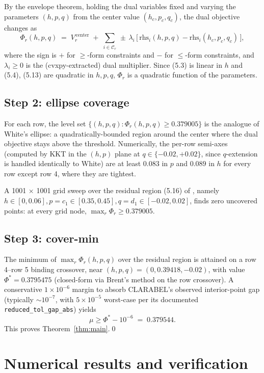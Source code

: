 \documentclass[11pt]{article}
\theoremstyle{plain}
\theoremstyle{definition}
\begin{document}
By the envelope theorem, holding the dual variables fixed and varying
the parameters $(h, p, q)$ from the center value
$(h_c, p_c, q_c)$, the dual objective changes as
\[
\Phi_r(h, p, q) \;=\; V_r^{\,\text{center}}
\;+\; \sum_{i \in \mathcal{C}_r}\, \pm\, \lambda_i\, \bigl[\,\text{rhs}_i(h, p, q) - \text{rhs}_i(h_c, p_c, q_c)\,\bigr],
\]
where the sign is $+$ for $\ge$-form constraints and $-$ for $\le$-form
constraints, and $\lambda_i \ge 0$ is the (cvxpy-extracted) dual
multiplier. Since (5.3) is linear in $h$ and (5.4), (5.13) are
quadratic in $h, p, q$, $\Phi_r$ is a quadratic function of the
parameters.

\subsection{Step 2: ellipse coverage}

For each row, the level set $\{(h, p, q) : \Phi_r(h, p, q) \ge 0.379005\}$
is the analogue of White's ellipse: a quadratically-bounded region
around the center where the dual objective stays above the threshold.
Numerically, the per-row semi-axes (computed by KKT in the $(h, p)$
plane at $q \in \{-0.02, +0.02\}$, since $q$-extension is handled
identically to White) are at least $0.083$ in $p$ and $0.089$ in $h$
for every row except row 4, where they are tightest.

A 1001 $\times$ 1001 grid sweep over the residual region (5.16) of
\cite{White2023}, namely $h \in [0, 0.06], p = c_1 \in [0.35, 0.45],
q = d_1 \in [-0.02, 0.02]$, finds zero uncovered points: at every grid
node, $\max_r \Phi_r \ge 0.379005$.

\subsection{Step 3: cover-min}

The minimum of $\max_r \Phi_r(h, p, q)$ over the residual region is
attained on a row 4--row 5 binding crossover, near
$(h, p, q) = (0, 0.39418, -0.02)$, with value $\Phi^{*} = 0.3795475$
(closed-form via Brent's method on the row crossover). A conservative
$1 \times 10^{-6}$ margin to absorb CLARABEL's observed
interior-point gap (typically $\sim 10^{-7}$, with $5 \times 10^{-5}$
worst-case per its documented \texttt{reduced\_tol\_gap\_abs}) yields
\[
\mu \ge \Phi^{*} - 10^{-6} \;=\; 0.379544.
\]
This proves Theorem~\ref{thm:main}.\qed

\section{Numerical results and verification}
\end{document}
